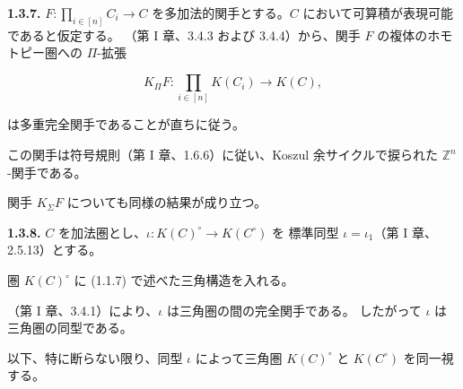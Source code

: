 
\clearpage
{}%
\begingroup
\small
\setlength{\emergencystretch}{1.5em}%
\setlength{\abovedisplayskip}{4pt plus 2pt minus 2pt}%
\setlength{\belowdisplayskip}{4pt plus 2pt minus 2pt}%

\noindent\textbf{1.3.7.}\quad
{}
$F\colon \prod_{i\in[n]} C_i\longrightarrow C$
を多加法的関手とする。$C$ において可算積が表現可能であると仮定する。
（第 I 章、3.4.3 および 3.4.4）から、関手 $F$ の複体のホモトピー圏への
$\Pi$-拡張

\[
  K_{\Pi}F\colon \prod_{i\in[n]} K(C_i)\longrightarrow K(C),
\]

\noindent は多重完全関手であることが直ちに従う。

この関手は符号規則（第 I 章、1.6.6）に従い、Koszul 余サイクルで捩られた
$\mathbb Z^n$-関手である。

関手 $K_{\Sigma}F$ についても同様の結果が成り立つ。

\medskip
\noindent\textbf{1.3.8.}\quad
{}
$C$ を加法圏とし、$\iota\colon K(C)^\circ\longrightarrow K(C^\circ)$ を
標準同型 $\iota=\iota_1$（第 I 章、2.5.13）とする。

圏 $K(C)^\circ$ に (1.1.7) で述べた三角構造を入れる。

（第 I 章、3.4.1）により、$\iota$ は三角圏の間の完全関手である。
したがって $\iota$ は三角圏の同型である。

以下、特に断らない限り、同型 $\iota$ によって三角圏 $K(C)^\circ$ と
$K(C^\circ)$ を同一視する。
\endgroup


